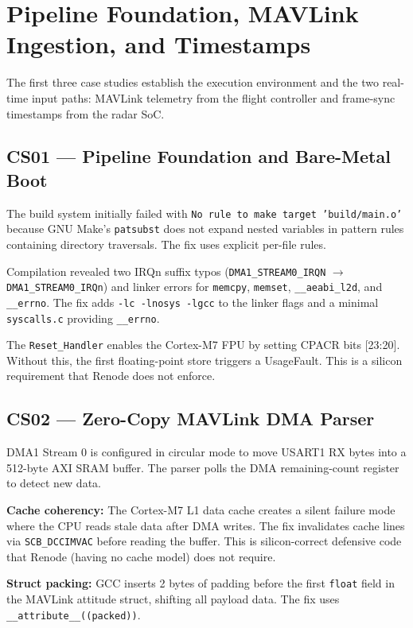 \section{Pipeline Foundation, MAVLink Ingestion, and Timestamps}
\label{sec:cs01-03}

The first three case studies establish the execution environment and the two real-time input paths: MAVLink telemetry from the flight controller and frame-sync timestamps from the radar SoC.

\subsection{CS01 --- Pipeline Foundation and Bare-Metal Boot}

The build system initially failed with \texttt{No rule to make target 'build/main.o'} because GNU Make's \texttt{patsubst} does not expand nested variables in pattern rules containing directory traversals. The fix uses explicit per-file rules.

Compilation revealed two IRQn suffix typos (\texttt{DMA1\_STREAM0\_IRQN} $\rightarrow$ \texttt{DMA1\_STREAM0\_IRQn}) and linker errors for \texttt{memcpy}, \texttt{memset}, \texttt{\_\_aeabi\_l2d}, and \texttt{\_\_errno}. The fix adds \texttt{-lc -lnosys -lgcc} to the linker flags and a minimal \texttt{syscalls.c} providing \texttt{\_\_errno}.

The \texttt{Reset\_Handler} enables the Cortex-M7 FPU by setting CPACR bits [23:20]. Without this, the first floating-point store triggers a UsageFault. This is a silicon requirement that Renode does not enforce.

\subsection{CS02 --- Zero-Copy MAVLink DMA Parser}

DMA1 Stream 0 is configured in circular mode to move USART1 RX bytes into a 512-byte AXI SRAM buffer. The parser polls the DMA remaining-count register to detect new data.

\textbf{Cache coherency:} The Cortex-M7 L1 data cache creates a silent failure mode where the CPU reads stale data after DMA writes. The fix invalidates cache lines via \texttt{SCB\_DCCIMVAC} before reading the buffer. This is silicon-correct defensive code that Renode (having no cache model) does not require.

\textbf{Struct packing:} GCC inserts 2 bytes of padding before the first \texttt{float} field in the MAVLink attitude struct, shifting all payload data. The fix uses \texttt{\_\_attribute\_\_((packed))}.

